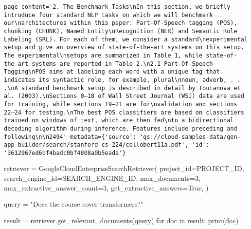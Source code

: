 \documentclass[
  letterpaper,
  DIV=11,
  numbers=noendperiod]{scrreprt}
\newenvironment{Shaded}{\begin{snugshade}}{\end{snugshade}}
\newcommand{\BuiltInTok}[1]{\textcolor[rgb]{0.00,0.23,0.31}{#1}}
\newcommand{\ControlFlowTok}[1]{\textcolor[rgb]{0.00,0.23,0.31}{#1}}
\newcommand{\DecValTok}[1]{\textcolor[rgb]{0.68,0.00,0.00}{#1}}
\newcommand{\KeywordTok}[1]{\textcolor[rgb]{0.00,0.23,0.31}{#1}}
\newcommand{\NormalTok}[1]{\textcolor[rgb]{0.00,0.23,0.31}{#1}}
\newcommand{\OperatorTok}[1]{\textcolor[rgb]{0.37,0.37,0.37}{#1}}
\newcommand{\StringTok}[1]{\textcolor[rgb]{0.13,0.47,0.30}{#1}}
\newcommand{\VariableTok}[1]{\textcolor[rgb]{0.07,0.07,0.07}{#1}}
\begin{document}
\begin{verbatim}
page_content='2. The Benchmark Tasks\nIn this section, we briefly introduce four standard NLP tasks on which we will benchmark our\narchitectures within this paper: Part-Of-Speech tagging (POS), chunking (CHUNK), Named Entity\nRecognition (NER) and Semantic Role Labeling (SRL). For each of them, we consider a standard\nexperimental setup and give an overview of state-of-the-art systems on this setup. The experimental\nsetups are summarized in Table 1, while state-of-the-art systems are reported in Table 2.\n2.1 Part-Of-Speech Tagging\nPOS aims at labeling each word with a unique tag that indicates its syntactic role, for example, plural\nnoun, adverb, . . .\nA standard benchmark setup is described in detail by Toutanova et al. (2003).\nSections 0–18 of Wall Street Journal (WSJ) data are used for training, while sections 19–21 are for\nvalidation and sections 22–24 for testing.\nThe best POS classifiers are based on classifiers trained on windows of text, which are then fed\nto a bidirectional decoding algorithm during inference. Features include preceding and following\n\n2494' metadata={'source': 'gs://cloud-samples-data/gen-app-builder/search/stanford-cs-224/collobert11a.pdf', 'id': '3612967ed6bf4badc0bf4808a0b5eada'}
\end{verbatim}

\begin{Shaded}
\begin{Highlighting}[]
\NormalTok{retriever }\OperatorTok{=}\NormalTok{ GoogleCloudEnterpriseSearchRetriever(}
\NormalTok{    project\_id}\OperatorTok{=}\NormalTok{PROJECT\_ID,}
\NormalTok{    search\_engine\_id}\OperatorTok{=}\NormalTok{SEARCH\_ENGINE\_ID,}
\NormalTok{    max\_documents}\OperatorTok{=}\DecValTok{3}\NormalTok{,}
\NormalTok{    max\_extractive\_answer\_count}\OperatorTok{=}\DecValTok{3}\NormalTok{,}
\NormalTok{    get\_extractive\_answers}\OperatorTok{=}\VariableTok{True}\NormalTok{,}
\NormalTok{)}
\end{Highlighting}
\end{Shaded}

\begin{Shaded}
\begin{Highlighting}[]
\NormalTok{query }\OperatorTok{=} \StringTok{"Does the course cover transformers?"}

\NormalTok{result }\OperatorTok{=}\NormalTok{ retriever.get\_relevant\_documents(query)}
\ControlFlowTok{for}\NormalTok{ doc }\KeywordTok{in}\NormalTok{ result:}
    \BuiltInTok{print}\NormalTok{(doc)}
\end{Highlighting}
\end{Shaded}
\end{document}
